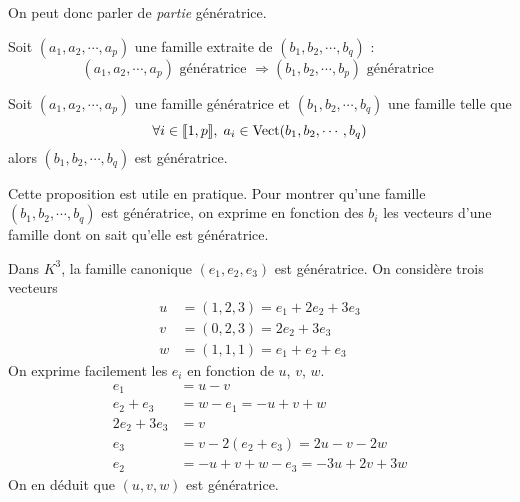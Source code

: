 On peut donc parler de \emph{partie} génératrice.
\begin{propn}
 Soit $(a_1,a_2,\cdots,a_p)$ une famille extraite de $(b_1,b_2,\cdots,b_q)$ :
\begin{displaymath}
 (a_1,a_2,\cdots,a_p) \text{ génératrice } \Rightarrow (b_1,b_2,\cdots,b_p) \text{ génératrice }
\end{displaymath}
\end{propn}

\begin{propn}
 Soit $(a_1,a_2,\cdots,a_p)$ une famille génératrice et $(b_1,b_2,\cdots,b_q)$ une famille telle que
\begin{displaymath}
 \forall i\in \llbracket 1, p\rrbracket,\; a_i\in \mathop{\mathrm{Vect}} (b_1,b_2,\cdots,b_q)
\end{displaymath}
alors $(b_1,b_2,\cdots,b_q)$ est génératrice.
\end{propn}
Cette proposition est utile en pratique. Pour montrer qu'une famille $(b_1,b_2,\cdots,b_q)$ est génératrice, on exprime en fonction des $b_i$ les vecteurs d'une famille dont on sait qu'elle est génératrice.
\begin{exple}
 Dans $K^3$, la famille canonique $(e_1,e_2,e_3)$ est génératrice. On considère trois vecteurs
\begin{align*}
 u &= (1,2,3) = e_1 + 2e_2 +3e_3 \\
 v &= (0,2,3) = 2e_2 +3e_3 \\
 w &= (1,1,1) =e_1+e_2+e_3
\end{align*}
On exprime facilement les $e_i$ en fonction de $u$, $v$, $w$.
\begin{align*}
 e_1 &= u-v \\
 e_2 + e_3 &= w-e_1 = -u +v +w \\
 2e_2+3e_3 &= v \\
 e_3 &= v -2(e_2+e_3)= 2u -v -2w \\
 e_2 &= -u+v+w -e_3 = -3u +2v +3w 
\end{align*}
On en déduit que $(u,v,w)$ est génératrice.
\end{exple}

